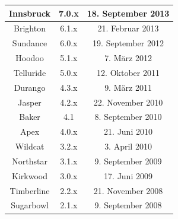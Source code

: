 \begin{table}[htbp]
{\begin{tabular}{|c|c|c|}
			Innsbruck                                & 7.0.x                                   & 18. September 2013                                \\ \hline
			Brighton                                 & 6.1.x                                   & 21. Februar 2013                                  \\ \hline
			Sundance                                 & 6.0.x                                   & 19. September 2012                                \\ \hline
			Hoodoo                                   & 5.1.x                                   & 7. März 2012                                      \\ \hline
			Telluride                                & 5.0.x                                   & 12. Oktober 2011                                  \\ \hline
			Durango                                  & 4.3.x                                   & 9. März 2011                                      \\ \hline
			Jasper                                   & 4.2.x                                   & 22. November 2010                                 \\ \hline
			Baker                                    & 4.1                                     & 8. September 2010                                 \\ \hline
			Apex                                     & 4.0.x                                   & 21. Juni 2010                                     \\ \hline
			Wildcat                                  & 3.2.x                                   & 3. April 2010                                     \\ \hline
			Northstar                                & 3.1.x                                   & 9. September 2009                                 \\ \hline
			Kirkwood                                 & 3.0.x                                   & 17. Juni 2009                                     \\ \hline
			Timberline                               & 2.2.x                                   & 21. November 2008                                 \\ \hline
			Sugarbowl                                & 2.1.x                                   & 9. September 2008                                 \\ \hline

\end{tabular}}
\end{table}
